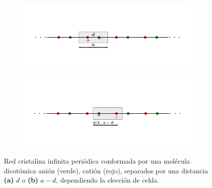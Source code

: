 \begin{figure}[tbh!]
    \centering
   \captionsetup[sub]{font=small}
    \begin{minipage}[h!]{1\textwidth}
        \begin{subfigure}[b!]{1 \textwidth}
            \caption{}
            \vspace*{-2em}
            \includegraphics[width=\textwidth]{Imagenes/Models/polarizatio_example_a.pdf}
        \end{subfigure}\hspace*{-0.5em}
    \end{minipage}\vspace*{-2.5em}

    \begin{minipage}[h!]{1\textwidth}
        \begin{subfigure}[b!]{1 \textwidth}
            \caption{}
            \vspace*{-2em}
            \includegraphics[width=\textwidth]{Imagenes/Models/polarizatio_example_b.pdf}
        \end{subfigure}\hspace*{-0.5em}
    \end{minipage}\vspace*{-1.5em}
    
    \caption{Red cristalina infinita periódica conformada por una molécula dicotómica anión (verde), catión (rojo), separados por una distancia \textbf{(a)} $d$ o \textbf{(b)} $a-d$, dependiendo la elección de celda.}
    \label{fig:Model_polarization}
\end{figure}